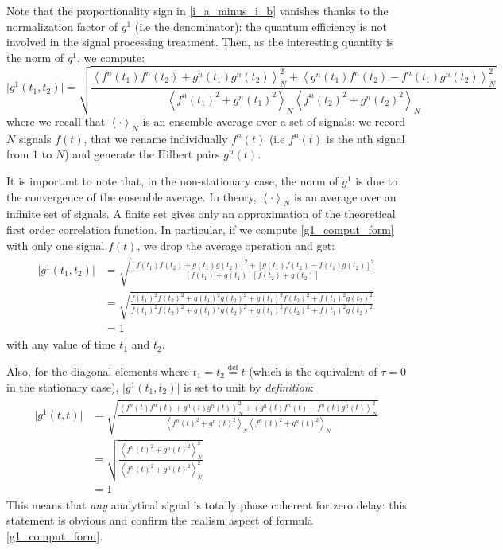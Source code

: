 \documentclass[11pt]{report}
\begin{document}
Note that the proportionality sign in \eqref{i_a_minus_i_b} vanishes thanks to the normalization factor of $g^1$ (i.e the denominator): the quantum efficiency is not involved in the signal processing treatment. Then, as the interesting quantity is the norm of $g^1$, we compute:
\begin{equation}
\label{g1_comput_form}
\vert g^1(t_1, t_2) \vert = \sqrt{\frac{\left\langle f^n(t_1)f^n(t_2) + g^n(t_1)g^n(t_2) \right\rangle^2_N + \left\langle g^n(t_1)f^n(t_2) - f^n(t_1)g^n(t_2) \right\rangle^2_N}{\left\langle f^n(t_1)^2 + g^n(t_1)^2 \right\rangle_N \left\langle f^n(t_2)^2 + g^n(t_2)^2 \right\rangle_N}}
\end{equation}
where we recall that $\left\langle \cdot \right\rangle_N$ is an ensemble average over a set of signals: we record $N$ signals $f(t)$, that we rename individually $f^n(t)$ (i.e $f^n(t)$ is the nth signal from $1$ to $N$) and generate the Hilbert pairs $g^n(t)$.

It is important to note that, in the non-stationary case, the norm of $g^1$ is due to the convergence of the ensemble average. In theory, $\left\langle \cdot \right\rangle_N$ is an average over an infinite set of signals. A finite set gives only an approximation of the theoretical first order correlation function. In particular, if we compute \eqref{g1_comput_form} with only one signal $f(t)$, we drop the average operation and get:
\begin{align}
\begin{split}
\vert g^1(t_1, t_2) \vert &= \sqrt{\frac{\left[f(t_1)f(t_2) + g(t_1)g(t_2) \right]^2 + \left[g(t_1)f(t_2) - f(t_1)g(t_2) \right]^2}{\left[f(t_1) + g(t_1) \right] \left[ f(t_2) + g(t_2) \right]}}\\
&= \sqrt{\frac{f(t_1)^2f(t_2)^2 + g(t_1)^2g(t_2)^2 + g(t_1)^2f(t_2)^2 + f(t_1)^2g(t_2)^2}{f(t_1)^2f(t_2)^2 + g(t_1)^2g(t_2)^2 + g(t_1)^2f(t_2)^2 + f(t_1)^2g(t_2)^2}}\\
&= 1
\end{split}
\end{align}
with any value of time $t_1$ and $t_2$.

Also, for the diagonal elements where $t_1=t_2\stackrel{\text{def}}{=}t$ (which is the equivalent of $\tau = 0$ in the stationary case), $\vert g^1(t_1, t_2) \vert$ is set to unit by \textit{definition}:
\begin{align}
\begin{split}
\vert g^1(t, t) \vert &= \sqrt{\frac{\left\langle f^n(t)f^n(t) + g^n(t)g^n(t) \right\rangle^2_N + \left\langle g^n(t)f^n(t) - f^n(t)g^n(t) \right\rangle^2_N}{\left\langle f^n(t)^2 + g^n(t)^2 \right\rangle_N \left\langle f^n(t)^2 + g^n(t)^2 \right\rangle_N}}\\
&= \sqrt{\frac{\left\langle f^n(t)^2 + g^n(t)^2 \right\rangle^2_N}{\left\langle f^n(t)^2 + g^n(t)^2 \right\rangle_N^2}}\\
&= 1
\end{split}
\end{align}
This means that \textit{any} analytical signal is totally phase coherent for zero delay: this statement is obvious and confirm the realism aspect of formula \ref{g1_comput_form}.
\end{document}
